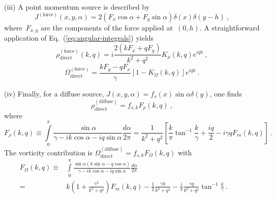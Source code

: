 \documentclass[preprint,aps,eqsecnum]{revtex4-1}
\newcommand{\dct}[1]{{#1}_\mathrm{direct}}
\begin{document}
(iii) A point momentum source is described by
\begin{equation}
  \label{eq:source-force-J}
  J^\mathrm{(force)}(x, y, \alpha)
  = 2 (F_x \cos\alpha + F_y \sin\alpha) \delta(x) \delta(y - h)
\ ,
\end{equation}
where~$F_{x, y}$ are the components of the force applied at~$(0, h)$.
A straightforward application of Eq.~(\ref{eq:angular-integrals}) yields
\begin{equation}
  \label{eq:source-force-rho}
  \dct{\rho}^\mathrm{(force)}(k, q)
      =  i \frac{2(k F_x + q F_y)}{k^2 + q^2}
               K_\rho(k, q)  e^{i q h}\ ,
\end{equation}
\begin{equation}
  \label{eq:source-force-omega}
  \dct{\Omega}^\mathrm{(force)} = \frac{kF_y - q F_x}{\gamma}
                                    \left[1 - K_\Omega(k, q)\right] e^{i q h}
  \ .
\end{equation}

(iv) Finally, for  a diffuse source,
$J(x, y, \alpha) = f_s(x) \sin\alpha \delta(y)$, one finds
\begin{equation}
  \label{eq:source-diff-rho}
  \dct{\rho}^\mathrm{(diffuse)} = f_{s, k} F_\rho(k, q)
  \ ,
\end{equation}
where
\begin{equation}
  \label{eq:source-frho-def}
  F_\rho(k, q) \equiv
  \int\limits_{0}^{\pi} \frac{\sin\alpha}{\gamma - i k \cos\alpha - i q \sin\alpha}
             \frac{d\alpha}{2\pi}
  =  \frac{1}{k^2 + q^2} \left[ \frac{k}{\pi} \tan^{-1}\frac{k}{\gamma}
                              + \frac{iq}{2}
  - i \gamma q F_m(k, q) \right]
  \ .
\end{equation}
The vorticity contribution is
$ \dct{\Omega}^\mathrm{(diffuse)} = f_{s, k} F_\Omega (k, q) $
with
\begin{align}
\label{eq:source-diff-omega}
  F_\Omega(k, q) \equiv{}&  \int\limits_{0}^{\pi}
              \frac{\sin\alpha (k \sin \alpha - q \cos\alpha)}{\gamma
                - i k \cos\alpha - i q \sin\alpha} \frac{d\alpha}{2\pi} && &
  \\
  ={}& k \left(1 + \frac{\gamma^2}{k^2 + q^2}\right) F_m(k, q)
                 -\frac{1}{2} \frac{\gamma k}{k^2 + q^2}
  - \frac{i}{\pi} \frac{\gamma q}{k^2 + q^2} \tan^{-1}\frac{k}{\gamma}
  \ .
  \nonumber
\end{align}
\end{document}
